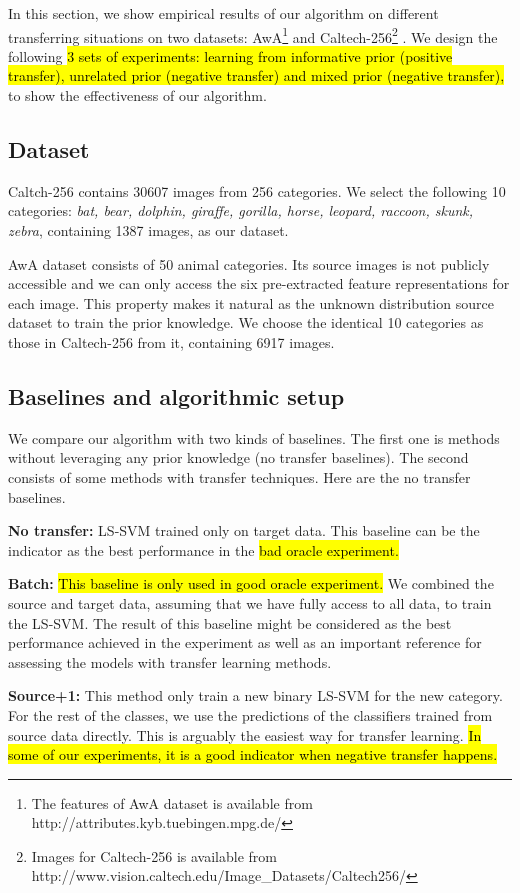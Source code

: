 In this section, we show empirical results of our algorithm on different transferring situations on two datasets: AwA\footnote{The features of AwA dataset is available from http://attributes.kyb.tuebingen.mpg.de/} \cite{lampert2009learning} and Caltech-256\footnote{Images for Caltech-256 is available from http://www.vision.caltech.edu/Image\_Datasets/Caltech256/} \cite{griffin2007caltech}. We design the following \hl{3 sets of experiments: learning from informative prior (positive transfer), unrelated prior (negative transfer) and mixed prior (negative transfer), } to show the effectiveness of our algorithm.
\subsection{Dataset}
Caltch-256 contains 30607 images from 256 categories. We select the following 10 categories: \textit{bat, bear, dolphin, giraffe, gorilla, horse, leopard, raccoon, skunk, zebra}, containing 1387 images, as our dataset.

AwA dataset consists of 50 animal categories. Its source images is not publicly accessible and we can only access the six pre-extracted feature representations for each image. This property makes it natural as the unknown distribution source dataset to train the prior knowledge. We choose the identical 10 categories as those in Caltech-256 from it, containing 6917 images.

\subsection{Baselines and algorithmic setup}
We compare our algorithm with two kinds of baselines. The first one is methods without leveraging any prior knowledge (no transfer baselines). The second consists of some methods with transfer techniques. Here are the no transfer baselines.

\textbf{No transfer:} LS-SVM trained only on target data. This baseline can be the indicator as the best performance in the \hl{bad oracle experiment.}

\textbf{Batch:} \hl{This baseline is only used in good oracle experiment.} We combined the source and target data, assuming that we have fully access to all data, to train the LS-SVM. The result of this baseline might be considered as the best performance achieved in the experiment as well as an important reference for assessing the models with transfer learning methods.

\textbf{Source+1:} This method only train a new binary LS-SVM for the new category. For the rest of the classes, we use the predictions of the classifiers trained from source data directly. This is arguably the easiest way for transfer learning. \hl{In some of our experiments, it is a good indicator when negative transfer happens.}

